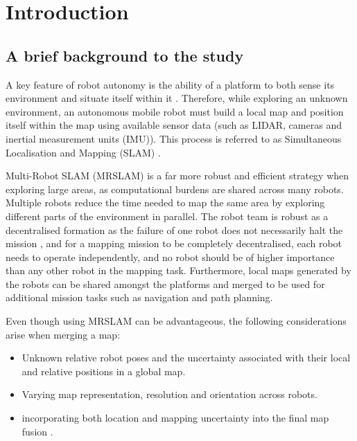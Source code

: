 \chapter{Introduction}
\label{ch:ch1}
\section{A brief background to the study}
\label{sec:ch1.section1}
A key feature of robot autonomy is the ability of a platform to both sense its environment and situate itself within it \cite{Siegwart2004}. Therefore, while exploring an unknown environment, an autonomous mobile robot must build a local map and position itself within the map using available sensor data (such as LIDAR, cameras and inertial measurement units (IMU)). This process is referred to as Simultaneous Localisation and Mapping (SLAM) \cite{Bailey2006b, Bailey2006a}.

Multi-Robot SLAM (MRSLAM) is a far more robust and efficient strategy when exploring large areas, as computational burdens are shared across many robots.  Multiple robots reduce the time needed to map the same area by exploring different parts of the environment in parallel. The robot team is robust as a decentralised formation as the failure of one robot does not necessarily halt the mission \cite{Leung2010}, and for a mapping mission to be completely decentralised, each robot needs to operate independently, and no robot should be of higher importance than any other robot in the mapping task. Furthermore, local maps generated by the robots can be shared amongst the platforms and merged to be used for additional mission tasks such as navigation and path planning.

Even though using MRSLAM can be advantageous, the following considerations arise when merging a map:
\begin{itemize}
    \item Unknown relative robot poses and the uncertainty associated with their local and relative positions in a global map.
    \item Varying map representation, resolution and orientation across robots.
    \item incorporating both location and mapping uncertainty into the final map fusion \cite{Saeedi}.
\end{itemize}
 
